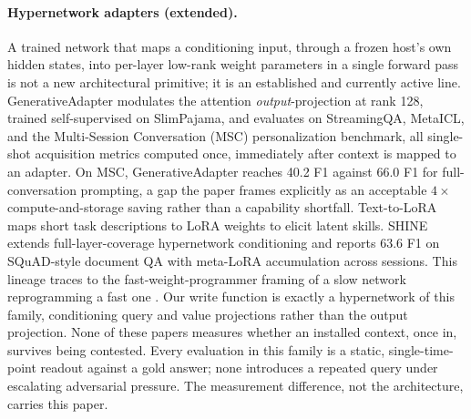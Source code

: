 \paragraph{Hypernetwork adapters (extended).} A trained network that maps a
conditioning input, through a frozen host's own hidden states, into per-layer low-rank
weight parameters in a single forward pass is not a new architectural primitive; it is
an established and currently active line. GenerativeAdapter \citep{chen2025generativeadapter}
modulates the attention \emph{output}-projection at rank 128, trained self-supervised on
SlimPajama, and evaluates on StreamingQA, MetaICL, and the Multi-Session Conversation
(MSC) personalization benchmark, all single-shot acquisition metrics computed once,
immediately after context is mapped to an adapter. On MSC, GenerativeAdapter reaches
40.2 F1 against 66.0 F1 for full-conversation prompting, a gap the paper frames
explicitly as an acceptable $4\times$ compute-and-storage saving rather than a
capability shortfall. Text-to-LoRA \citep{charakorn2025texttolora} maps short task
descriptions to LoRA weights to elicit latent skills. SHINE \citep{liu2026shine} extends
full-layer-coverage hypernetwork conditioning and reports 63.6 F1 on SQuAD-style
document QA with meta-LoRA accumulation across sessions. This lineage traces to the
fast-weight-programmer framing of a slow network reprogramming a fast one
\citep{schmidhuber1993reduce,ba2016fastweights,schlag2021linear}. Our write function is
exactly a hypernetwork of this family, conditioning query and value projections rather
than the output projection. None of these papers measures whether an installed
context, once in, survives being contested. Every evaluation in this family is a
static, single-time-point readout against a gold answer; none introduces a repeated
query under escalating adversarial pressure. The measurement difference, not the
architecture, carries this paper.

